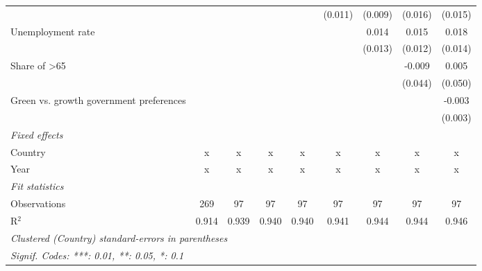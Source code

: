 \begin{table}[htbp]
\begin{tabular}{lcccccccc}
                                              &              &              &              &             & (0.011)      & (0.009)      & (0.016)      & (0.015)\\   
      Unemployment rate                       &              &              &              &             &              & 0.014        & 0.015        & 0.018\\   
                                              &              &              &              &             &              & (0.013)      & (0.012)      & (0.014)\\   
      Share of >65                            &              &              &              &             &              &              & -0.009       & 0.005\\   
                                              &              &              &              &             &              &              & (0.044)      & (0.050)\\   
      Green vs. growth government preferences &              &              &              &             &              &              &              & -0.003\\   
                                              &              &              &              &             &              &              &              & (0.003)\\   
      \emph{Fixed effects}\\
      Country                                 & x            & x            & x            & x           & x            & x            & x            & x\\  
      Year                                    & x            & x            & x            & x           & x            & x            & x            & x\\  
      \midrule \emph{Fit statistics}\\
      Observations                            & 269          & 97           & 97           & 97          & 97           & 97           & 97           & 97\\  
      R$^2$                                   & 0.914        & 0.939        & 0.940        & 0.940       & 0.941        & 0.944        & 0.944        & 0.946\\  
      \midrule
      \multicolumn{9}{l}{\emph{Clustered (Country) standard-errors in parentheses}}\\
      \multicolumn{9}{l}{\emph{Signif. Codes: ***: 0.01, **: 0.05, *: 0.1}}\\
   \end{tabular}
\end{table}


